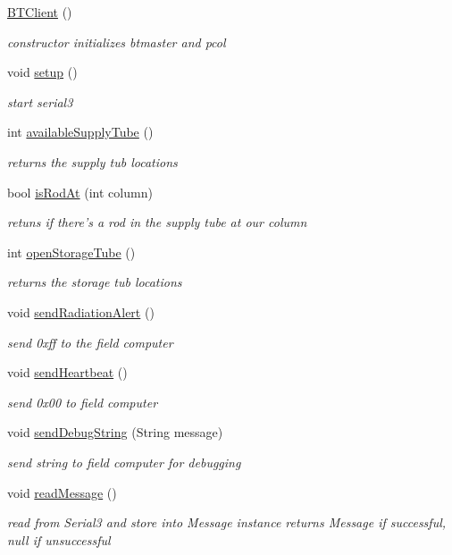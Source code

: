 \begin{DoxyCompactItemize}
\item 
\hyperlink{classBTClient_a60dc22e0906a1cea7a88813bb6d98f96}{B\-T\-Client} ()
\begin{DoxyCompactList}\small\item\em constructor initializes btmaster and pcol \end{DoxyCompactList}\item 
void \hyperlink{classBTClient_aefdc156fe1f22455d249ec0bb7fa3fd5}{setup} ()
\begin{DoxyCompactList}\small\item\em start serial3 \end{DoxyCompactList}\item 
int \hyperlink{classBTClient_a67250c48f81fee2b7c9f26d100c26799}{available\-Supply\-Tube} ()
\begin{DoxyCompactList}\small\item\em returns the supply tub locations \end{DoxyCompactList}\item 
bool \hyperlink{classBTClient_a3140dacfc561f8c122a76961cc71f9d9}{is\-Rod\-At} (int column)
\begin{DoxyCompactList}\small\item\em retuns if there's a rod in the supply tube at our column \end{DoxyCompactList}\item 
int \hyperlink{classBTClient_a18e2223a0605a0ee67b5d004890b38c4}{open\-Storage\-Tube} ()
\begin{DoxyCompactList}\small\item\em returns the storage tub locations \end{DoxyCompactList}\item 
void \hyperlink{classBTClient_a70cc30b8de8632bd6fb81972a9409a10}{send\-Radiation\-Alert} ()
\begin{DoxyCompactList}\small\item\em send 0xff to the field computer \end{DoxyCompactList}\item 
void \hyperlink{classBTClient_a4bf8f58f2c83834cab585e69c55c171f}{send\-Heartbeat} ()
\begin{DoxyCompactList}\small\item\em send 0x00 to field computer \end{DoxyCompactList}\item 
void \hyperlink{classBTClient_a57a82b64a1233a66450c1d9ebe48774c}{send\-Debug\-String} (String message)
\begin{DoxyCompactList}\small\item\em send string to field computer for debugging \end{DoxyCompactList}\item 
void \hyperlink{classBTClient_a8e827d16926d45a4b7c18dda0e59837b}{read\-Message} ()
\begin{DoxyCompactList}\small\item\em read from Serial3 and store into Message instance returns Message if successful, null if unsuccessful \end{DoxyCompactList}\end{DoxyCompactItemize}
